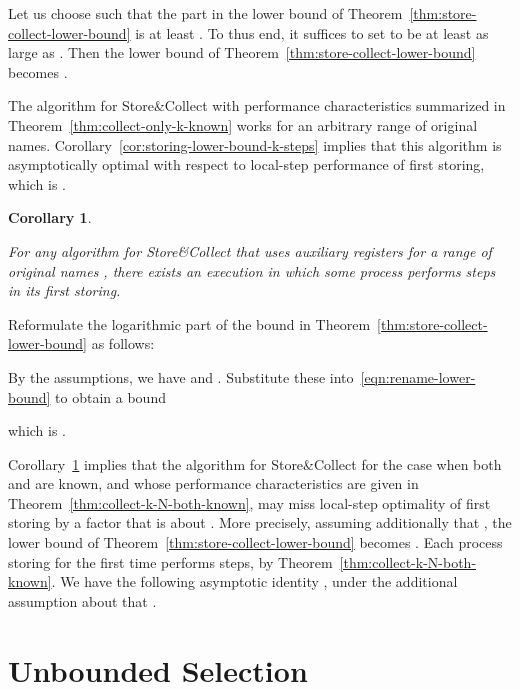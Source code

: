 \documentclass[11pt]{article}
\newcommand{\qed}{\hfill  \smallbreak}
\newenvironment{proof}{\noindent{\bf Proof:}}{\qed}
\newtheorem{corollary}{Corollary}
\begin{document}
\begin{proof}
Let us choose  such that the part  in the lower bound of Theorem~\ref{thm:store-collect-lower-bound} is at least .
To thus end, it suffices to set  to be at least as large as .
Then the lower bound of Theorem~\ref{thm:store-collect-lower-bound} becomes .
\end{proof}


The algorithm for Store\&Collect with performance characteristics summarized in Theorem~\ref{thm:collect-only-k-known} works for an arbitrary range  of original names.
Corollary~\ref{cor:storing-lower-bound-k-steps} implies that this algorithm is asymptotically optimal with respect to local-step performance of first storing, which is .



\begin{corollary}
\label{cor:lower-bound-k-N-storing}

For any algorithm for Store\&Collect that  uses  auxiliary registers for a range of original names , there exists an execution in which some process performs  steps in its first storing.
\end{corollary}

\begin{proof}
Reformulate the logarithmic part of the bound in Theorem~\ref{thm:store-collect-lower-bound} as follows:

By the assumptions, we have   and .
Substitute these into~\eqref{eqn:rename-lower-bound} to obtain a bound

which is .
\end{proof}

Corollary~\ref{cor:lower-bound-k-N-storing} implies that the algorithm for Store\&Collect for the case when both  and  are known, and whose performance characteristics are given in Theorem~\ref{thm:collect-k-N-both-known}, may miss local-step optimality of first storing by a factor that is about .
More precisely, assuming additionally that , the lower bound of Theorem~\ref{thm:store-collect-lower-bound} becomes . 
Each process storing for the first time  performs   steps, by Theorem~\ref{thm:collect-k-N-both-known}. 
We have the following asymptotic  identity , under the additional assumption about  that .





\section{Unbounded Selection}
\end{document}
